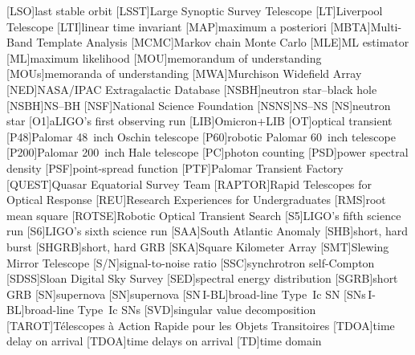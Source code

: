 \begin{acronym}
[LSO]{last stable orbit}
[LSST]{Large Synoptic Survey Telescope}
[LT]{Liverpool Telescope}
[LTI]{linear time invariant}
[MAP]{maximum a posteriori}
[MBTA]{Multi-Band Template Analysis}
[MCMC]{Markov chain Monte Carlo}
[MLE]{\ac{ML} estimator}
[ML]{maximum likelihood}
[MOU]{memorandum of understanding}
[MOUs]{memoranda of understanding}
[MWA]{Murchison Widefield Array}
[NED]{NASA/IPAC Extragalactic Database}
[NSBH]{neutron star\nobreakdashes--black hole}
[NSBH]{\acl{NS}\nobreakdashes--\acl{BH}}
[NSF]{National Science Foundation}
[NSNS]{\acl{NS}\nobreakdashes--\acl{NS}}
[NS]{neutron star}
[O1]{\acl{aLIGO}'s first observing run}
[LIB]{Omicron+\acl{LIB}}
[OT]{optical transient}
[P48]{Palomar 48~inch Oschin telescope}
[P60]{robotic Palomar 60~inch telescope}
[P200]{Palomar 200~inch Hale telescope}
[PC]{photon counting}
[PSD]{power spectral density}
[PSF]{point-spread function}
[PTF]{Palomar Transient Factory}
[QUEST]{Quasar Equatorial Survey Team}
[RAPTOR]{Rapid Telescopes for Optical Response}
[REU]{Research Experiences for Undergraduates}
[RMS]{root mean square}
[ROTSE]{Robotic Optical Transient Search}
[S5]{\ac{LIGO}'s fifth science run}
[S6]{\ac{LIGO}'s sixth science run}
[SAA]{South Atlantic Anomaly}
[SHB]{short, hard burst}
[SHGRB]{short, hard \acl{GRB}}
[SKA]{Square Kilometer Array}
[SMT]{Slewing Mirror Telescope}
[S/N]{signal\nobreakdashes-to\nobreakdashes-noise ratio}
[SSC]{synchrotron self\nobreakdashes-Compton}
[SDSS]{Sloan Digital Sky Survey}
[SED]{spectral energy distribution}
[SGRB]{short \acl{GRB}}
[SN]{supernova}
[SN]{supernova}
[\acs{SN}\,I\nobreakdashes-BL]{broad\nobreakdashes-line Type~Ic \ac{SN}}
[\acsp{SN}\,I\nobreakdashes-BL]{broad\nobreakdashes-line Type~Ic \acp{SN}}
[SVD]{singular value decomposition}
[TAROT]{T\'{e}lescopes \`{a} Action Rapide pour les Objets Transitoires}
[TDOA]{time delay on arrival}
[TDOA]{time delays on arrival}
[TD]{time domain}

\end{acronym}
